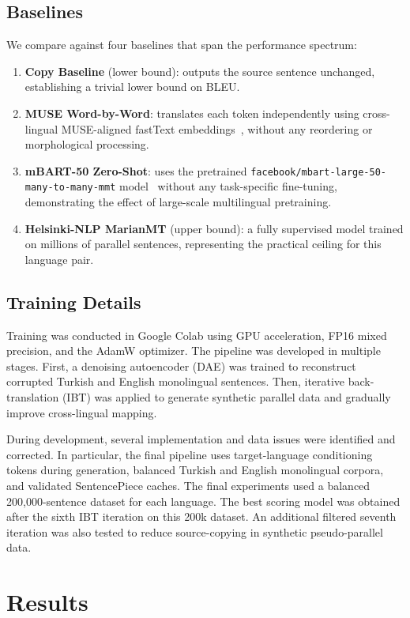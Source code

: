 \documentclass[runningheads]{llncs}
\begin{document}
\subsection{Baselines}
We compare against four baselines that span the performance spectrum:
\begin{enumerate}
    \item \textbf{Copy Baseline} (lower bound): outputs the source sentence unchanged, establishing a trivial lower bound on BLEU.
    \item \textbf{MUSE Word-by-Word}: translates each token independently using cross-lingual MUSE-aligned fastText embeddings~\cite{conneau2017word}, without any reordering or morphological processing.
    \item \textbf{mBART-50 Zero-Shot}: uses the pretrained \texttt{facebook/mbart-large-50-many-to-many-mmt} model~\cite{liu2020multilingual} without any task-specific fine-tuning, demonstrating the effect of large-scale multilingual pretraining.
    \item \textbf{Helsinki-NLP MarianMT} (upper bound): a fully supervised model trained on millions of parallel sentences, representing the practical ceiling for this language pair.
\end{enumerate}

\subsection{Training Details}
Training was conducted in Google Colab using GPU acceleration, FP16 mixed precision, and the AdamW optimizer. The pipeline was developed in multiple stages. First, a denoising autoencoder (DAE) was trained to reconstruct corrupted Turkish and English monolingual sentences. Then, iterative back-translation (IBT) was applied to generate synthetic parallel data and gradually improve cross-lingual mapping.

During development, several implementation and data issues were identified and corrected. In particular, the final pipeline uses target-language conditioning tokens during generation, balanced Turkish and English monolingual corpora, and validated SentencePiece caches. The final experiments used a balanced 200,000-sentence dataset for each language. The best scoring model was obtained after the sixth IBT iteration on this 200k dataset. An additional filtered seventh iteration was also tested to reduce source-copying in synthetic pseudo-parallel data.

\section{Results}
\end{document}
